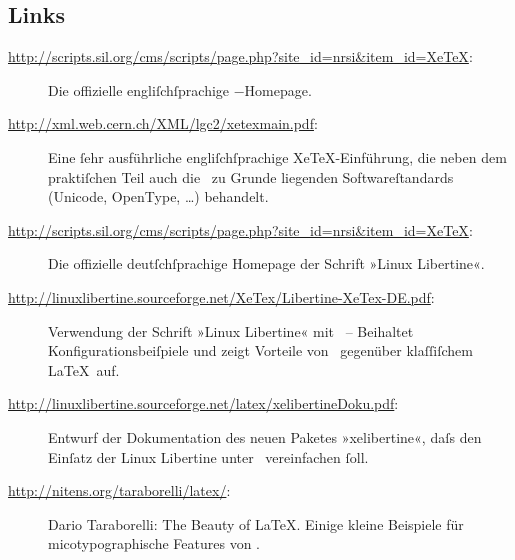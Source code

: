﻿\documentclass{scrartcl}
\begin{document}
\subsection*{Links}
\begin{description}
\item[\url{http://scripts.sil.org/cms/scripts/page.php?site_id=nrsi&item_id=XeTeX}:] Die offizielle engliſchſprachige \XeTeX−Homepage.
\item[\url{http://xml.web.cern.ch/XML/lgc2/xetexmain.pdf}:] Eine ſehr ausführliche engliſchſprachige XeTeX-Einführung, die neben dem praktiſchen Teil auch die \XeTeX\ zu Grunde liegenden Softwareſtandards (Unicode, OpenType, …) behandelt.
\item[\url{http://scripts.sil.org/cms/scripts/page.php?site_id=nrsi&item_id=XeTeX}:] Die offizielle deutſchſprachige Homepage der Schrift »Linux Libertine«.
\item[\url{http://linuxlibertine.sourceforge.net/XeTex/Libertine-XeTex-DE.pdf}:] Verwendung der Schrift »Linux Libertine« mit \XeTeX\ – Beihaltet Konfigurationsbeiſpiele und zeigt Vorteile von \XeTeX\ gegenüber klaſſiſchem \LaTeX\ auf.
\item[\url{http://linuxlibertine.sourceforge.net/latex/xelibertineDoku.pdf}:] Entwurf der Dokumentation des neuen Paketes »xelibertine«, daſs den Einſatz der Linux Libertine unter \XeTeX\ vereinfachen ſoll.
\item[\url{http://nitens.org/taraborelli/latex/}:] Dario Taraborelli: The Beauty of LaTeX. Einige kleine Beispiele für micotypographische Features von \XeTeX.
\end{description}



\end{document}
